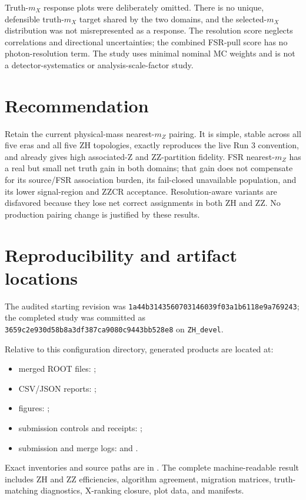 \documentclass[11pt]{article}
\newcommand{\mZ}{m_{Z}}
\newcommand{\mX}{m_{X}}
\begin{document}
Truth-$\mX$ response plots were deliberately omitted.  There is no unique,
defensible truth-$\mX$ target shared by the two domains, and the selected-$\mX$
distribution was not misrepresented as a response.  The resolution score
neglects correlations and directional uncertainties; the combined FSR-pull
score has no photon-resolution term.  The study uses minimal nominal MC
weights and is not a detector-systematics or analysis-scale-factor study.

\section{Recommendation}

Retain the current physical-mass nearest-$\mZ$ pairing.  It is simple, stable
across all five eras and all five ZH topologies, exactly reproduces the live
Run 3 convention, and already gives high associated-Z and ZZ-partition
fidelity.  FSR nearest-$\mZ$ has a real but small net truth gain in both
domains; that gain does not compensate for its source/FSR association burden,
its fail-closed unavailable population, and its lower signal-region and ZZCR
acceptance.  Resolution-aware variants are disfavored because they lose net
correct assignments in both ZH and ZZ.  No production pairing change is
justified by these results.

\appendix
\section{Reproducibility and artifact locations}

The audited starting revision was
\texttt{1a44b3143560703146039f03a1b6118e9a769243}; the completed study was
committed as \texttt{3659c2e930d58b8a3df387ca9080c9443bb528e8} on
\texttt{ZH\_devel}.

Relative to this configuration directory, generated products are located at:
\begin{itemize}
  \item merged ROOT files: ;
  \item CSV/JSON reports: ;
  \item figures: ;
  \item submission controls and receipts:
        ;
  \item submission and merge logs:
         and
        .
\end{itemize}

Exact inventories and source paths are in
.
The complete machine-readable result includes ZH and ZZ efficiencies,
algorithm agreement, migration matrices, truth-matching diagnostics,
X-ranking closure, plot data, and manifests.
\end{document}
